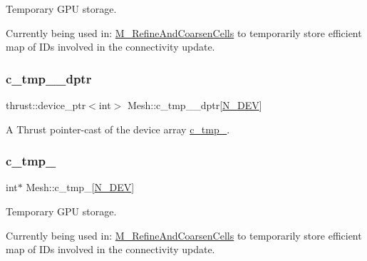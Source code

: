 Temporary G\+PU storage. 

Currently being used in\+: \hyperlink{classMesh_a7f1c861db5b8168cff9dabf728c0ce1a}{M\+\_\+\+Refine\+And\+Coarsen\+Cells} to temporarily store \textquotesingle{}efficient\textquotesingle{} map of I\+Ds involved in the connectivity update. \mbox{\label{classMesh_ad099220464b551c59ce43c9bfffeb335}} 
\subsubsection{\texorpdfstring{c\+\_\+tmp\+\_\+\_\+dptr}{c\_tmp\_6\_dptr}}
{\footnotesize\ttfamily thrust\+::device\+\_\+ptr$<$int$>$ Mesh\+::c\+\_\+tmp\+\_\+\_\+dptr\mbox{[}\hyperlink{cppspec_8h_a2b674dab7a14f1bf32b48b7fda5022dc}{N\+\_\+\+D\+EV}\mbox{]}\hspace{0.3cm}{\ttfamily [private]}}



A Thrust pointer-\/cast of the device array \hyperlink{classMesh_a139c783dde5036a64bd83c02b65990bd}{c\+\_\+tmp\+\_}. 

\mbox{\label{classMesh_ad6e01f4bf87d025aa407a79fedbf73fd}} 
\subsubsection{\texorpdfstring{c\+\_\+tmp\+\_}{c\_tmp\_7}}
{\footnotesize\ttfamily int$\ast$ Mesh\+::c\+\_\+tmp\+\_\mbox{[}\hyperlink{cppspec_8h_a2b674dab7a14f1bf32b48b7fda5022dc}{N\+\_\+\+D\+EV}\mbox{]}\hspace{0.3cm}{\ttfamily [private]}}



Temporary G\+PU storage. 

Currently being used in\+: \hyperlink{classMesh_a7f1c861db5b8168cff9dabf728c0ce1a}{M\+\_\+\+Refine\+And\+Coarsen\+Cells} to temporarily store \textquotesingle{}efficient\textquotesingle{} map of I\+Ds involved in the connectivity update. \mbox{\label{classMesh_ab83bb565c6d935d1a82c52de4816a679}} 
